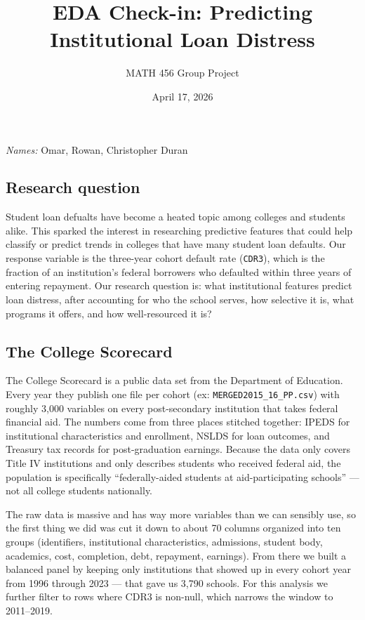 \documentclass[
]{article}
\title{EDA Check-in: Predicting Institutional Loan Distress}
\author{MATH 456 Group Project}
\date{April 17, 2026}
\begin{document}
\maketitle

\emph{Names:} Omar, Rowan, Christopher Duran

\subsection{Research question}\label{research-question}

Student loan defualts have become a heated topic among colleges and
students alike. This sparked the interest in researching predictive
features that could help classify or predict trends in colleges that
have many student loan defaults. Our response variable is the three-year
cohort default rate (\texttt{CDR3}), which is the fraction of an
institution's federal borrowers who defaulted within three years of
entering repayment. Our research question is: what institutional
features predict loan distress, after accounting for who the school
serves, how selective it is, what programs it offers, and how
well-resourced it is?

\subsection{The College Scorecard}\label{the-college-scorecard}

The College Scorecard is a public data set from the Department of
Education. Every year they publish one file per cohort (ex:
\texttt{MERGED2015\_16\_PP.csv}) with roughly 3,000 variables on every
post-secondary institution that takes federal financial aid. The numbers
come from three places stitched together: IPEDS for institutional
characteristics and enrollment, NSLDS for loan outcomes, and Treasury
tax records for post-graduation earnings. Because the data only covers
Title IV institutions and only describes students who received federal
aid, the population is specifically ``federally-aided students at
aid-participating schools'' --- not all college students nationally.

The raw data is massive and has way more variables than we can sensibly
use, so the first thing we did was cut it down to about 70 columns
organized into ten groups (identifiers, institutional characteristics,
admissions, student body, academics, cost, completion, debt, repayment,
earnings). From there we built a balanced panel by keeping only
institutions that showed up in every cohort year from 1996 through 2023
--- that gave us 3,790 schools. For this analysis we further filter to
rows where CDR3 is non-null, which narrows the window to 2011--2019.
\end{document}
